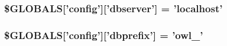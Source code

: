 \hypertarget{config_8php_bb3d30de18f7004caa11db993e7acc2d}{
\subsubsection{\setlength{\rightskip}{0pt plus 5cm}\$GLOBALS\mbox{[}'config'\mbox{]}\mbox{[}'dbserver'\mbox{]} = 'localhost'}}
\label{config_8php_bb3d30de18f7004caa11db993e7acc2d}


\hypertarget{config_8php_649654c29dcea71eb7da0541b4458b41}{
\subsubsection{\setlength{\rightskip}{0pt plus 5cm}\$GLOBALS\mbox{[}'config'\mbox{]}\mbox{[}'dbprefix'\mbox{]} = 'owl\_\-'}}
\label{config_8php_649654c29dcea71eb7da0541b4458b41}


